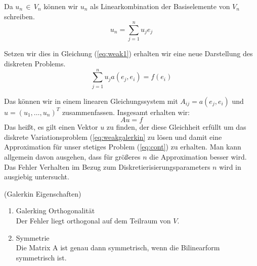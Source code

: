 Da $u_n \, \in \, V_n$ können wir $u_n$ als Linearkombination der Basiselemente von $V_n$ schreiben.
\begin{equation}
u_n = \sum_{j=1}^{n} u_j e_j
\end{equation}

Setzen wir dies in Gleichung (\ref{eq:weak1}) erhalten wir eine neue Darstellung des diskreten Problems.
\begin{equation}
\sum_{j=1}^{n} u_j a( e_j, e_i ) = f(e_i)
\end{equation}

Das können wir in einem linearen Gleichungssystem mit $A_{ij}=a(e_j,e_i)$ und $u=(u_1,\dots,u_n)^{T}$ zusammenfassen. Insgesamt erhalten wir:
\begin{equation}
Au=f
\end{equation}
Das heißt, es gilt einen Vektor $u$ zu finden, der diese Gleichheit erfüllt um das diskrete Variationsproblem (\ref{eq:weakgalerkin} zu lösen und damit eine Approximation für unser stetiges Problem (\ref{eq:cont}) zu erhalten. Man kann allgemein davon ausgehen, dass für größeres $n$ die Approximation besser wird. Das Fehler Verhalten im Bezug zum Diskretierisierungsparameters $n$ wird in \cite[154]{Numerik} ausgiebig untersucht.

\begin{Bemerkung} (Galerkin Eigenschaften) \\
\begin{enumerate} 
\item Galerking Orthogonalität \\
Der Fehler liegt orthogonal auf dem Teilraum von $V$.
\item Symmetrie \\
Die Matrix A ist genau dann symmetrisch, wenn die Bilinearform symmetrisch ist.
\end{enumerate}
\end{Bemerkung}

